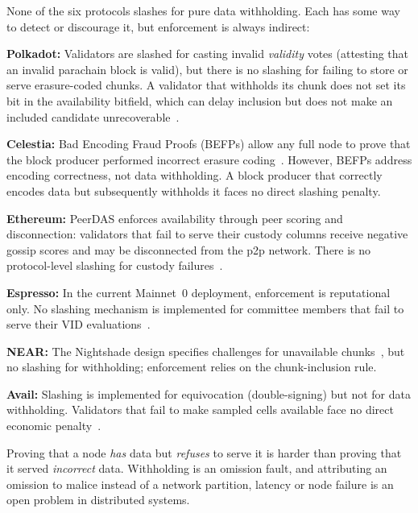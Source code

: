 None of the six protocols slashes for pure data withholding.
Each has some way to detect or discourage it, but enforcement is always indirect:

\squishlist
\item \textbf{Polkadot:} Validators are slashed for casting invalid \emph{validity} votes (attesting that an invalid parachain block is valid), but there is no slashing for failing to store or serve erasure-coded chunks. A validator that withholds its chunk does not set its bit in the availability bitfield, which can delay inclusion but does not make an included candidate unrecoverable~\cite{Jeff_Burdges_ELVES}.

\item \textbf{Celestia:} Bad Encoding Fraud Proofs (BEFPs) allow any full node to prove that the block producer performed incorrect erasure coding~\cite{AlBassam_FraudDA}. However, BEFPs address encoding correctness, not data withholding. A block producer that correctly encodes data but subsequently withholds it faces no direct slashing penalty.

\item \textbf{Ethereum:} PeerDAS enforces availability through peer scoring and disconnection: validators that fail to serve their custody columns receive negative gossip scores and may be disconnected from the p2p network. There is no protocol-level slashing for custody failures~\cite{EIP-7594}.

\item \textbf{Espresso:} In the current Mainnet~0 deployment, enforcement is reputational only. No slashing mechanism is implemented for committee members that fail to serve their VID evaluations~\cite{Espresso:Hotshot_and_Triamisu}.

\item \textbf{NEAR:} The Nightshade design specifies challenges for unavailable chunks~\cite{NEAR_Nightshade_Scaling_Blockchain}, but no slashing for withholding; enforcement relies on the chunk-inclusion rule.

\item \textbf{Avail:} Slashing is implemented for equivocation (double-signing) but not for data withholding. Validators that fail to make sampled cells available face no direct economic penalty~\cite{Avail_The_DA_Blockchain}.
\squishend

Proving that a node \emph{has} data but \emph{refuses} to serve it is harder than proving that it served \emph{incorrect} data.
Withholding is an omission fault, and attributing an omission to malice instead of a network partition, latency or node failure is an open problem in distributed systems.

